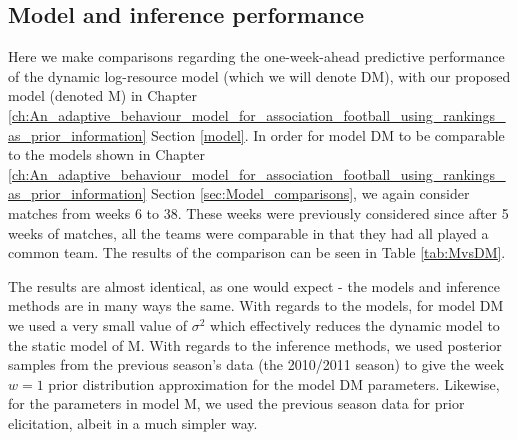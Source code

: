 \subsection{Model and inference performance}

Here we make comparisons regarding the one-week-ahead predictive performance of the dynamic log-resource model (which we
will denote DM), with our proposed model (denoted M) in Chapter
\ref{ch:An_adaptive_behaviour_model_for_association_football_using_rankings_as_prior_information} Section \ref{model}.
In order for model DM to be comparable to the models shown in Chapter
\ref{ch:An_adaptive_behaviour_model_for_association_football_using_rankings_as_prior_information} Section
\ref{sec:Model_comparisons}, we again consider matches from weeks 6 to 38. These weeks were previously considered since
after 5 weeks of matches, all the teams were comparable in that they had all played a common team. The results of the
comparison can be seen in Table \ref{tab:MvsDM}.
\begin{table} 
\begin{center}
\end{center}
\caption{\label{tab:MvsDM} A comparison of the sum of the logarithmic scoring rule, the geometric mean of the one-week
ahead predicted probabilities for the match outcomes that were actually observed, and the betting
profit, for models M and DM for weeks 6 to 38}
\end{table}
The results are almost identical, as one would expect - the models and inference methods are in many ways the same. With
regards to the models, for model DM we used a very small value of \(\sigma^2\) which effectively reduces the dynamic
model to the static model of M. With regards to the inference methods, we used posterior samples from the previous
season's data (the 2010/2011 season) to give the week \(w = 1\) prior distribution approximation for the model DM
parameters. Likewise, for the parameters in model M, we used the previous season data for prior elicitation, albeit in a
much simpler way. 

